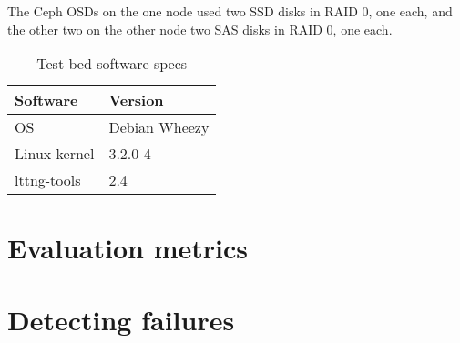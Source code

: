 The Ceph OSDs on the one node used two SSD disks in RAID 0, one each, and the
other two on the other node two SAS disks in RAID 0, one each.

\begin{table}[H]
    \centering
    \begin{tabular}{ | l | l | }
        \hline
        Software & Version \\ \hline \hline
        OS &  Debian Wheezy \\ \hline
        Linux kernel & 3.2.0-4 \\ \hline
        lttng-tools & 2.4 \\ \hline
    \end{tabular}
    \caption{Test-bed software specs}
    \label{tab:software-specs}
\end{table}

\section{Evaluation
metrics}\label{sec:metrics}

\section{Detecting failures}\label{sec:failures} 

